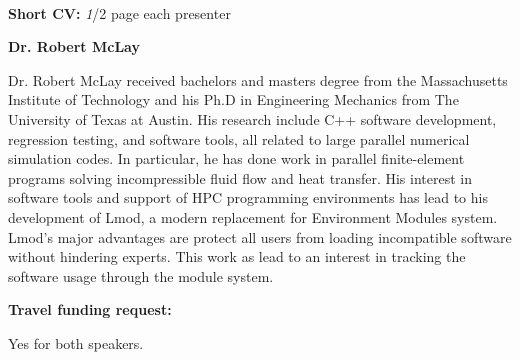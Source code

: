 \documentclass[12pt]{article}
\begin{document}
~~

\noindent
{\bf{}Short CV:} {\emph 1/2 page each presenter}

\noident
{\bf{}Dr. Robert McLay}

Dr. Robert McLay received bachelors and masters degree from the Massachusetts 
Institute of Technology and his Ph.D in Engineering Mechanics from The University 
of Texas at Austin.  His research include C++ software development, regression 
testing, and software tools, all related to large parallel numerical simulation codes.  
In particular, he has done work in parallel finite-element programs solving 
incompressible fluid flow and heat transfer.
His interest in software tools and support of HPC programming environments has 
lead to his development of Lmod, a modern replacement for Environment Modules 
system.  Lmod's major advantages are protect all users from loading incompatible 
software without hindering experts.  This work as lead to an interest in tracking the 
software usage through the module system.

\noindent
{\bf{}Travel funding request:}

Yes for both speakers.
\end{document}
